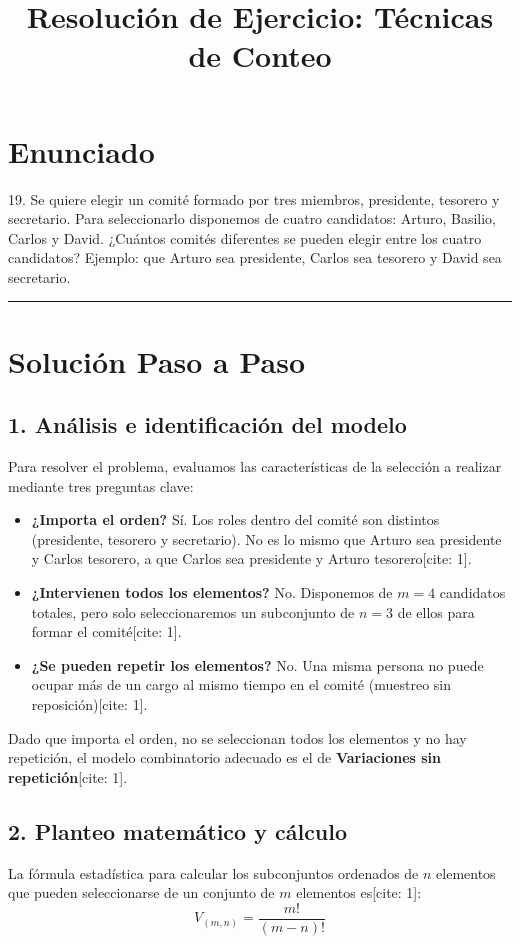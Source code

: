 \documentclass[12pt, a4paper]{article}
\title{Resolución de Ejercicio: Técnicas de Conteo}
\author{}
\date{}
\begin{document}
\maketitle

\section*{Enunciado}
19. Se quiere elegir un comité formado por tres miembros, presidente, tesorero y secretario. Para seleccionarlo disponemos de cuatro candidatos: Arturo, Basilio, Carlos y David. ¿Cuántos comités diferentes se pueden elegir entre los cuatro candidatos? Ejemplo: que Arturo sea presidente, Carlos sea tesorero y David sea secretario.

\vspace{0.5cm}
\hrule
\vspace{0.5cm}

\section*{Solución Paso a Paso}

\subsection*{1. Análisis e identificación del modelo}
Para resolver el problema, evaluamos las características de la selección a realizar mediante tres preguntas clave:
\begin{itemize}[label=\checkmark]
    \item \textbf{¿Importa el orden?} Sí. Los roles dentro del comité son distintos (presidente, tesorero y secretario). No es lo mismo que Arturo sea presidente y Carlos tesorero, a que Carlos sea presidente y Arturo tesorero[cite: 1].
    \item \textbf{¿Intervienen todos los elementos?} No. Disponemos de $m=4$ candidatos totales, pero solo seleccionaremos un subconjunto de $n=3$ de ellos para formar el comité[cite: 1].
    \item \textbf{¿Se pueden repetir los elementos?} No. Una misma persona no puede ocupar más de un cargo al mismo tiempo en el comité (muestreo sin reposición)[cite: 1].
\end{itemize}

Dado que importa el orden, no se seleccionan todos los elementos y no hay repetición, el modelo combinatorio adecuado es el de \textbf{Variaciones sin repetición}[cite: 1].

\subsection*{2. Planteo matemático y cálculo}
La fórmula estadística para calcular los subconjuntos ordenados de $n$ elementos que pueden seleccionarse de un conjunto de $m$ elementos es[cite: 1]:
\[ V_{(m,n)} = \frac{m!}{(m-n)!} \]
\end{document}
